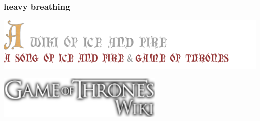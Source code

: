 \documentclass{beamer}
\begin{document}
\begin{frame}
  \frametitle{heavy breathing}
  \begin{center}
    \includegraphics[width = \textwidth, keepaspectratio = true]{figure/ice}

    \includegraphics[width = 0.6\textwidth, keepaspectratio = true]{figure/got}
  \end{center}
\end{frame}
\end{document}
